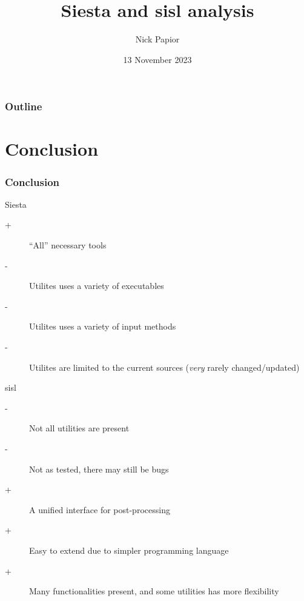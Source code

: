 

\graphicspath{{fig/}}


\date{13 November 2023}
\title{Siesta and sisl analysis}
\author{Nick Papior}



\begin{frame}
  \titlepage
\end{frame}

\begin{frame}
  \frametitle{Outline}
  \tableofcontents
\end{frame}




\section{Conclusion}

\begin{frame}
  \frametitle{Conclusion}

  \begin{block}{Siesta}
    \begin{description}
      \item[+] ``All'' necessary tools
      \item[-] Utilites uses a variety of executables
      \item[-] Utilites uses a variety of input methods
      \item[-] Utilites are limited to the current sources (\emph{very} rarely changed/updated)
    \end{description}
  \end{block}

  \begin{block}{sisl}
    \begin{description}
      \item[-] Not all utilities are present
      \item[-] Not as tested, there may still be bugs
      \item[+] A unified interface for post-processing
      \item[+] Easy to extend due to simpler programming language
      \item[+] Many functionalities present, and some utilities has more flexibility
    \end{description}
  \end{block}
  
\end{frame}


